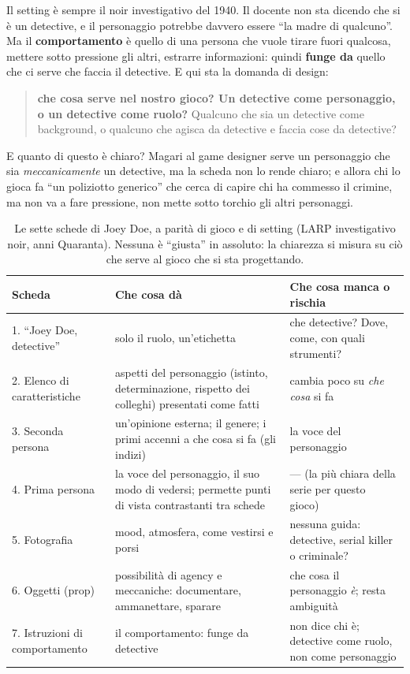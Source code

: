 Il setting è sempre il noir investigativo del 1940. Il docente non sta dicendo che
si è un detective, e il personaggio potrebbe davvero essere ``la madre di qualcuno''.
Ma il \textbf{comportamento} è quello di una persona che vuole tirare fuori qualcosa,
mettere sotto pressione gli altri, estrarre informazioni: quindi \textbf{funge da}
quello che ci serve che faccia il detective. E qui sta la domanda di design:
\begin{quote}
\textbf{che cosa serve nel nostro gioco? Un detective come personaggio, o un
detective come ruolo?} Qualcuno che sia un detective come background, o qualcuno che
agisca da detective e faccia cose da detective?
\end{quote}
E quanto di questo è chiaro? Magari al game designer serve un personaggio che sia
\emph{meccanicamente} un detective, ma la scheda non lo rende chiaro; e allora chi
lo gioca fa ``un poliziotto generico'' che cerca di capire chi ha commesso il
crimine, ma non va a fare pressione, non mette sotto torchio gli altri personaggi.

\begin{table}[htbp]
\centering
\small
\begin{tabular}{@{}p{2.9cm}p{5.0cm}p{5.2cm}@{}}
\toprule
\textbf{Scheda} & \textbf{Che cosa dà} & \textbf{Che cosa manca o rischia} \\
\midrule
1. ``Joey Doe, detective'' & solo il ruolo, un'etichetta & che detective? Dove, come,
con quali strumenti? \\
2. Elenco di caratteristiche & aspetti del personaggio (istinto, determinazione,
rispetto dei colleghi) presentati come fatti & cambia poco su \emph{che cosa} si fa \\
3. Seconda persona & un'opinione esterna; il genere; i primi accenni a che cosa si
fa (gli indizi) & la voce del personaggio \\
4. Prima persona & la voce del personaggio, il suo modo di vedersi; permette punti
di vista contrastanti tra schede & --- (la più chiara della serie per questo
gioco) \\
5. Fotografia & mood, atmosfera, come vestirsi e porsi & nessuna guida: detective,
serial killer o criminale? \\
6. Oggetti (prop) & possibilità di agency e meccaniche: documentare, ammanettare,
sparare & che cosa il personaggio \emph{è}; resta ambiguità \\
7. Istruzioni di comportamento & il comportamento: funge da detective & non dice
chi è; detective come ruolo, non come personaggio \\
\bottomrule
\end{tabular}
\caption{Le sette schede di Joey Doe, a parità di gioco e di setting (LARP
investigativo noir, anni Quaranta). Nessuna è ``giusta'' in assoluto: la chiarezza
si misura su ciò che serve al gioco che si sta progettando.}
\label{a4:tab:joey}
\end{table}


